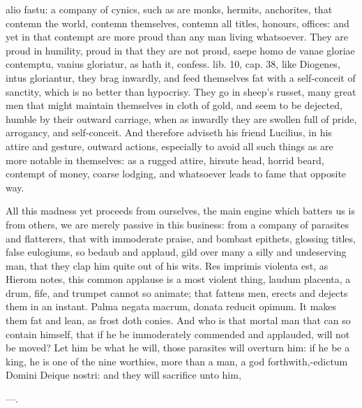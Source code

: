 {alio fastu: a company of cynics, such as are monks, hermits,
anchorites, that contemn the world, contemn themselves, contemn all
titles, honours, offices: and yet in that contempt are more proud than
any man living whatsoever. They are proud in humility, proud in that
they are not proud, saepe homo de vanae gloriae contemptu, vanius
gloriatur, as \Austin{} hath it, confess. lib. 10, cap. 38, like Diogenes,
intus gloriantur, they brag inwardly, and feed themselves fat with a
self-conceit of sanctity, which is no better than hypocrisy. They go in
sheep's russet, many great men that might maintain themselves in cloth
of gold, and seem to be dejected, humble by their outward carriage,
when as inwardly they are swollen full of pride, arrogancy, and
self-conceit. And therefore \Seneca adviseth his friend Lucilius,
in his attire and gesture, outward actions, especially to avoid
all such things as are more notable in themselves: as a rugged attire,
hirsute head, horrid beard, contempt of money, coarse lodging, and
whatsoever leads to fame that opposite way.

All this madness yet proceeds from ourselves, the main engine which
batters us is from others, we are merely passive in this business: from
a company of parasites and flatterers, that with immoderate praise, and
bombast epithets, glossing titles, false eulogiums, so bedaub and
applaud, gild over many a silly and undeserving man, that they clap him
quite out of his wits. Res imprimis violenta est, as Hierom notes, this
common applause is a most violent thing, laudum placenta, a drum, fife,
and trumpet cannot so animate; that fattens men, erects and dejects
them in an instant.  Palma negata macrum, donata reducit opimum.
It makes them fat and lean, as frost doth conies. And who is that
mortal man that can so contain himself, that if he be immoderately
commended and applauded, will not be moved? Let him be what he will,
those parasites will overturn him: if he be a king, he is one of the
nine worthies, more than a man, a god forthwith,-edictum Domini
Deique nostri: and they will sacrifice unto him,

---.

}
